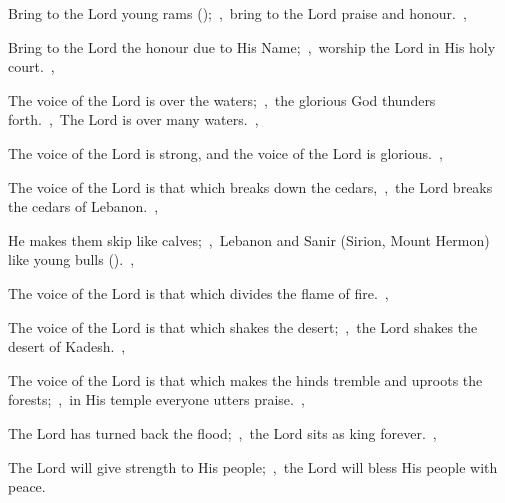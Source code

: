 \documentclass[12pt,twoside,a5paper]{article}
\begin{document}
\begin{normalparskip}
  Bring to the Lord young rams ();~\sep\ bring to the Lord praise and honour.~\sep


  Bring to the Lord the honour due to His Name;~\sep\ worship the Lord in His holy court.~\sep

  The voice of the Lord is over the waters;~\sep\ the glorious God thunders forth.~\sep\ The Lord is over many waters.~\sep

  The voice of the Lord is strong, and the voice of the Lord is glorious.~\sep

  The voice of the Lord is that which breaks down the cedars,~\sep\ the Lord breaks the cedars of Lebanon.~\sep

  He makes them skip like calves;~\sep\ Lebanon and Sanir (Sirion, Mount Hermon) like young bulls ().~\sep

  The voice of the Lord is that which divides the flame of fire.~\sep

  The voice of the Lord is that which shakes the desert;~\sep\ the Lord shakes the desert of Kadesh.~\sep

  The voice of the Lord is that which makes the hinds tremble and uproots the forests;~\sep\ in His temple everyone utters praise.~\sep

  The Lord has turned back the flood;~\sep\ the Lord sits as king forever.~\sep

  The Lord will give strength to His people;~\sep\ the Lord will bless His people with peace.
\end{normalparskip}

\end{document}
